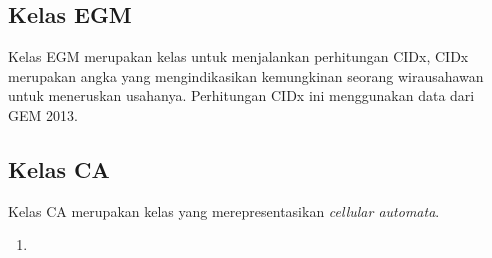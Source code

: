 \subsection{Kelas EGM}
	Kelas EGM merupakan kelas untuk menjalankan perhitungan CIDx, CIDx merupakan angka yang mengindikasikan kemungkinan seorang wirausahawan untuk meneruskan usahanya. Perhitungan CIDx ini menggunakan data dari GEM 2013.
	
\subsection{Kelas CA} 
Kelas CA merupakan kelas yang merepresentasikan \textit{cellular automata}.
		\begin{enumerate}
			\item 
		\end{enumerate}
